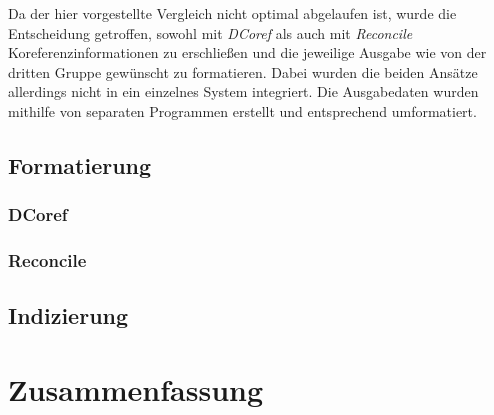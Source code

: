 \documentclass[a4paper,12pt,titlepage=true, ngerman]{scrartcl}
\begin{document}
Da der hier vorgestellte Vergleich nicht optimal abgelaufen ist, wurde die Entscheidung getroffen, 
sowohl mit \emph{DCoref} als auch mit \emph{Reconcile} Koreferenzinformationen zu erschließen 
und die jeweilige Ausgabe wie von der dritten Gruppe gewünscht zu formatieren. 
Dabei wurden die beiden Ansätze allerdings nicht in ein einzelnes System integriert. 
Die Ausgabedaten wurden mithilfe von separaten Programmen erstellt und entsprechend umformatiert.



\subsection{Formatierung}\label{Verlauf:Formatierung}%



\subsubsection{DCoref}%





\subsubsection{Reconcile}




\subsection{Indizierung}\label{Indizierung}





\section{Zusammenfassung}%


\end{document}
